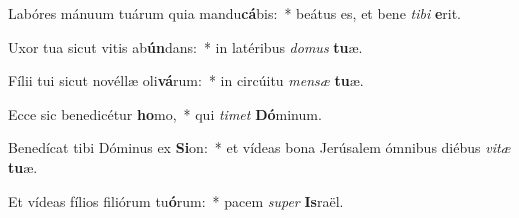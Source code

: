 \item Labóres mánuum tuárum quia mandu\textbf{cá}bis:~* beátus es, et bene \textit{ti}\textit{bi} \textbf{e}rit.
\item Uxor tua sicut vitis ab\textbf{ún}dans:~* in latéribus \textit{do}\textit{mus} \textbf{tu}æ.
\item Fílii tui sicut novéllæ oli\textbf{vá}rum:~* in circúitu \textit{men}\textit{sæ} \textbf{tu}æ.
\item Ecce sic benedicétur \textbf{ho}mo,~* qui \textit{ti}\textit{met} \textbf{Dó}minum.
\item Benedícat tibi Dóminus ex \textbf{Si}on:~* et vídeas bona Jerúsalem ómnibus diébus \textit{vi}\textit{tæ} \textbf{tu}æ.
\item Et vídeas fílios filiórum tu\textbf{ó}rum:~* pacem \textit{su}\textit{per} \textbf{Is}raël.
